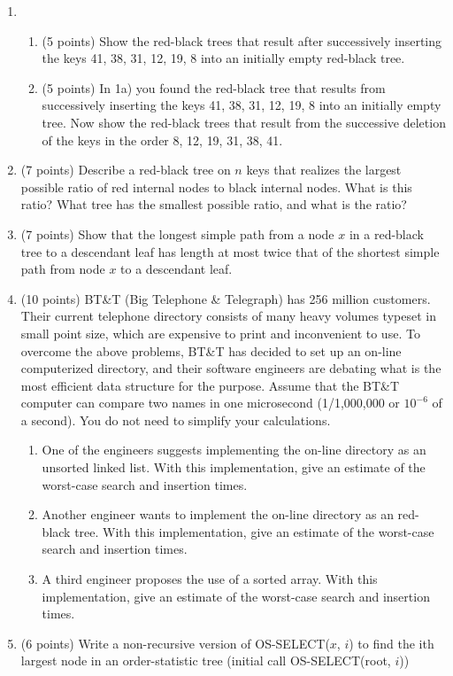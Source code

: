 \documentclass[12pt]{report}
\begin{document}
\maketitle

\begin{enumerate}[label=\arabic*.]
	\item	%
    \begin{enumerate}[label=\arabic{enumi}\alph*)]
        \item (5 points) Show the red-black trees that result after successively inserting the keys 41, 38, 31, 12, 19, 8 into an initially empty red-black tree.
		\item (5 points) In 1a) you found the red-black tree that results from successively inserting the keys 41, 38, 31, 12, 19, 8 into an initially empty tree. Now show the red-black trees that result from the successive deletion of the keys in the order 8, 12, 19, 31, 38, 41.
    \end{enumerate}
	\setcounter{enumi}{1}
	\item (7 points) Describe a red-black tree on $n$ keys that realizes the largest possible ratio of red internal nodes to black internal nodes. What is this ratio? What tree has the smallest possible ratio, and what is the ratio?
	\item (7 points) Show that the longest simple path from a node $x$ in a red-black tree to a descendant leaf has length at most twice that of the shortest simple path from node $x$ to a descendant leaf.
	\item (10 points) BT\&T (Big Telephone \& Telegraph) has 256 million customers. Their current telephone directory consists of many heavy volumes typeset in small point size, which are expensive to print and inconvenient to use. To overcome the above problems, BT\&T has decided to set up an on-line computerized directory, and their software engineers are debating what is the most efficient data structure for the purpose. Assume that the BT\&T computer can compare two names in one microsecond (1/1,000,000 or $10^{-6}$ of a second). You do not need to simplify your calculations.
	\begin{enumerate}[label=\arabic{enumi}\alph*)]
	    \item One of the engineers suggests implementing the on-line directory as an unsorted linked list. With this implementation, give an estimate of the worst-case search and insertion times.
		\item Another engineer wants to implement the on-line directory as an red-black tree. With this implementation, give an estimate of the worst-case search and insertion times.
		\item A third engineer proposes the use of a sorted array. With this implementation, give an estimate of the worst-case search and insertion times.
	\end{enumerate}
	\item (6 points) Write a non-recursive version of OS-SELECT($x$, $i$) to find the ith largest node in an order-statistic tree (initial call OS-SELECT(root, $i$))
\end{enumerate}
\end{document}
